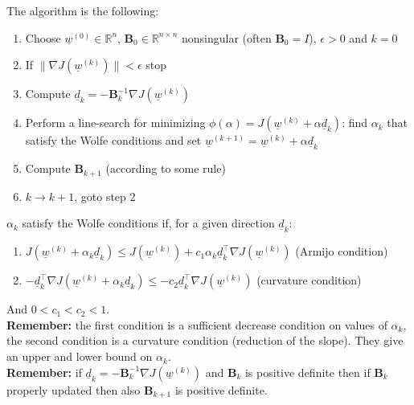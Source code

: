 The algorithm is the following:
\begin{enumerate}
    \item Choose $\underline{w}^{(0)} \in \mathbb{R}^n$, $\mathbf{B}_0 \in \mathbb{R}^{n \times n}$ nonsingular (often $\mathbf{B}_0 = I$), $\epsilon > 0$ and $k = 0$
    \item If $\|\nabla J(\underline{w}^{(k)})\| < \epsilon$ stop
    \item Compute $\underline{d}_k = - \mathbf{B}_k^{-1}\nabla J(\underline{w}^{(k)})$
    \item Perform a line-search for minimizing $\phi(\alpha) = J(\underline{w}^{(k)} + \alpha\underline{d}_k)$: find $\alpha_k$ that satisfy the Wolfe conditions and set $\underline{w}^{(k+1)} = \underline{w}^{(k)} + \alpha \underline{d}_k$ 
    \item Compute $\mathbf{B}_{k+1}$ (according to some rule)
    \item $k \to k+1$, goto step 2
\end{enumerate}
$\alpha_k$ satisfy the Wolfe conditions if, for a given direction $\underline{d}_k$:
\begin{enumerate}
    \item $J(\underline{w}^{(k)} + \alpha_k\underline{d}_k) \leq J(\underline{w}^{(k)}) + c_1 \alpha_k \underline{d}_k^\intercal \nabla J(\underline{w}^{(k)}) $ (Armijo condition)
    \item $- \underline{d}_k^\intercal \nabla J(\underline{w}^{(k)} + \alpha_k\underline{d}_k) \leq -c_2 \underline{d}_k^\intercal \nabla J(\underline{w}^{(k)})$ (curvature condition)
\end{enumerate}
And $0 < c_1 < c_2 < 1$.\\

\textbf{Remember: } the first condition is a sufficient decrease condition on values of $\alpha_k$, the second condition is a curvature condition (reduction of the slope). They give an upper and lower bound on $\alpha_k$.\\

\textbf{Remember: } if $\underline{d}_k = - \mathbf{B}_k^{-1}\nabla J(\underline{w}^{(k)})$ and $\textbf{B}_k$ is positive definite then if $\textbf{B}_k$ properly updated then also $\textbf{B}_{k+1}$ is positive definite. \\


